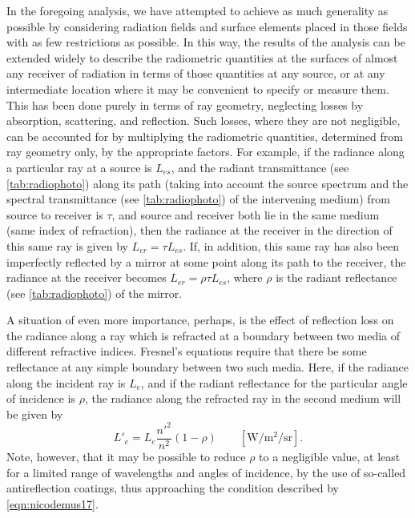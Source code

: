\begin{refsection}
In the foregoing analysis, we have attempted to achieve as much generality
as possible by considering radiation fields and surface elements placed in
those fields with as few restrictions as possible. In this way, the results
of the analysis can be extended widely to describe the radiometric quantities
at the surfaces of almost any receiver of radiation in terms of those quantities
at any source, or at any intermediate location where it may be convenient to specify or measure
them. This has been done purely in terms of ray geometry, neglecting losses
by absorption, scattering, and reflection. Such losses, where they are
not negligible, can be accounted for by multiplying the radiometric quantities,
determined from ray geometry only, by the appropriate factors.
For example, if the radiance along a particular ray at a source is
$L_{es}$, and the radiant transmittance (see \cref{tab:radiophoto}) along
its path (taking into account the source spectrum and the spectral transmittance
(see \cref{tab:radiophoto}) of the intervening medium) from source to
receiver is $\tau$, and source and receiver both lie in the same medium (same
index of refraction), then the radiance at the receiver in the direction of
this same ray is given by $L_{er} = \tau L_{es}$. If, in addition, this same
ray has also been imperfectly reflected by a mirror at some point along its
path to the receiver, the radiance at the receiver becomes $L_{er} = \rho \tau L_{es}$,
where $\rho$ is the radiant reflectance (see \cref{tab:radiophoto}) of
the mirror.

A situation of even more importance, perhaps, is the effect of reflection loss
on the radiance along a ray which is refracted at a boundary between two media
of different refractive indices.
Fresnel’s equations require that there be some reflectance at any simple
boundary between two such media. Here, if the radiance along the incident ray
is $L_e$, and if the radiant reflectance for the particular angle of incidence
is $\rho$, the radiance along the refracted ray in the second medium
will be given by
\begin{equation}
L'_e = L_e \frac{n'^2}{n^2} (1-\rho)
\qquad \left[\unit{\watt\per\square\meter\per\steradian}\right].
\end{equation}
Note, however, that it may be possible to reduce $\rho$ to a negligible value,
at least for a limited range of wavelengths and angles of incidence, by the
use of so-called antireflection coatings, thus approaching the condition
described by \cref{eqn:nicodemus17}.


\end{refsection}
